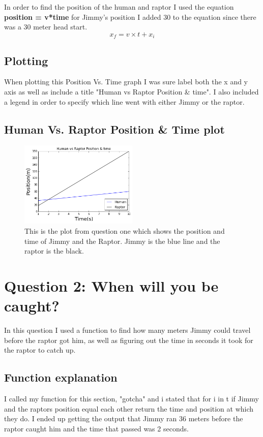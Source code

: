 \documentclass[twocolumn]{revtex4}
\begin{document}
In order to find the position of the human and raptor I used the equation \textbf{position = v*time} for Jimmy's position I added 30 to the equation since there was a 30 meter head start.$$x_f = v \times t + x_i $$ 

\subsection{Plotting}
When plotting this Position Vs. Time graph I was sure label both the x and y axis as well as include a title "Human vs Raptor Position \& time". I also included a legend in order to specify which line went with either Jimmy or the raptor.


\subsection{Human Vs. Raptor Position \& Time plot}
\begin{figure}
\includegraphics[width=0.5\textwidth]{Jimmy_Graph.png}
\caption {This is the plot from question one which shows the 	position and time of Jimmy and the Raptor. Jimmy is the blue line and the raptor is the black.}
\label{fig:Position vs. Time}
\end{figure}


\section{Question 2: When will you be caught?}

In this question I used a function to find how many meters Jimmy could travel before the raptor got him, as well as figuring out the time in seconds it took for the raptor to catch up. 

\subsection{Function explanation}

I called my function for this section, "gotcha" and i stated that for i in t if Jimmy and the raptors position equal each other return the time and position at which they do. I ended up getting the output that Jimmy ran 36 meters before the raptor caught him and the time that passed was 2 seconds. 
\end{document}
